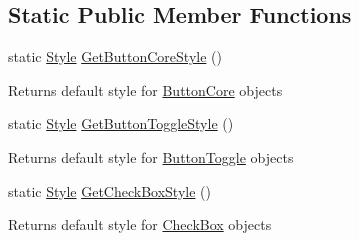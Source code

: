 \subsection*{Static Public Member Functions}
\begin{DoxyCompactItemize}
\item 
\mbox{\label{class_space_v_i_l_1_1_decorations_1_1_style_a834a214a52f1f7190e55dd5a7660da34}} 
static \mbox{\hyperlink{class_space_v_i_l_1_1_decorations_1_1_style}{Style}} \mbox{\hyperlink{class_space_v_i_l_1_1_decorations_1_1_style_a834a214a52f1f7190e55dd5a7660da34}{Get\+Button\+Core\+Style}} ()
\begin{DoxyCompactList}\small\item\em \begin{DoxyReturn}{Returns}
default style for \mbox{\hyperlink{class_space_v_i_l_1_1_button_core}{Button\+Core}} objects 
\end{DoxyReturn}
\end{DoxyCompactList}\item 
\mbox{\label{class_space_v_i_l_1_1_decorations_1_1_style_ae2420838cd40a26c911c2a2ae082a72b}} 
static \mbox{\hyperlink{class_space_v_i_l_1_1_decorations_1_1_style}{Style}} \mbox{\hyperlink{class_space_v_i_l_1_1_decorations_1_1_style_ae2420838cd40a26c911c2a2ae082a72b}{Get\+Button\+Toggle\+Style}} ()
\begin{DoxyCompactList}\small\item\em \begin{DoxyReturn}{Returns}
default style for \mbox{\hyperlink{class_space_v_i_l_1_1_button_toggle}{Button\+Toggle}} objects 
\end{DoxyReturn}
\end{DoxyCompactList}\item 
\mbox{\label{class_space_v_i_l_1_1_decorations_1_1_style_a3c2a60466968c5d4b7917ad3fe38600a}} 
static \mbox{\hyperlink{class_space_v_i_l_1_1_decorations_1_1_style}{Style}} \mbox{\hyperlink{class_space_v_i_l_1_1_decorations_1_1_style_a3c2a60466968c5d4b7917ad3fe38600a}{Get\+Check\+Box\+Style}} ()
\begin{DoxyCompactList}\small\item\em \begin{DoxyReturn}{Returns}
default style for \mbox{\hyperlink{class_space_v_i_l_1_1_check_box}{Check\+Box}} objects 

\end{DoxyReturn}
\end{DoxyCompactList}
\end{DoxyCompactItemize}

